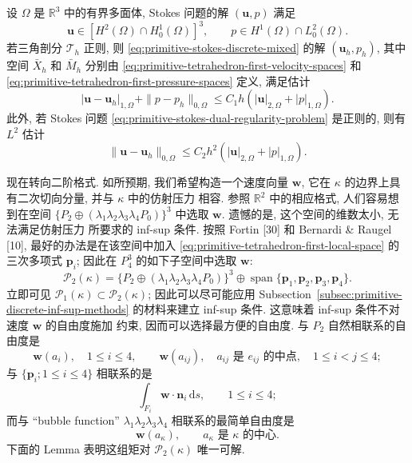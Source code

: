 \setcounter{statement}{3}
\begin{Theorem}\label{thm:primitive-tetrahedron-first-convergence}
设 $\Omega$ 是 $\mathbb R^3$ 中的有界多面体, Stokes 问题的解
$(\mathbf u,p)$ 满足
\[
\mathbf u\in[H^2(\Omega)\cap H_0^1(\Omega)]^3,
\qquad p\in H^1(\Omega)\cap L_0^2(\Omega).
\]
若三角剖分 $\mathcal{T}_h$ 正则, 则
\eqref{eq:primitive-stokes-discrete-mixed} 的解 $(\mathbf u_h,p_h)$,
其中空间 $\bar X_h$ 和 $\bar M_h$ 分别由
\eqref{eq:primitive-tetrahedron-first-velocity-spaces} 和
\eqref{eq:primitive-tetrahedron-first-pressure-spaces} 定义, 满足估计
\begin{equation}\label{eq:primitive-tetrahedron-first-h1-error}
|\mathbf u-\mathbf u_h|_{1,\Omega}
+\|p-p_h\|_{0,\Omega}
\leq C_1h(|\mathbf u|_{2,\Omega}+|p|_{1,\Omega}).
\end{equation}
此外, 若 Stokes 问题
\eqref{eq:primitive-stokes-dual-regularity-problem} 是正则的, 则有
$L^2$ 估计
\begin{equation}\label{eq:primitive-tetrahedron-first-l2-error}
\|\mathbf u-\mathbf u_h\|_{0,\Omega}
\leq C_2h^2(|\mathbf u|_{2,\Omega}+|p|_{1,\Omega}).
\end{equation}
\end{Theorem}

现在转向二阶格式. 如所预期, 我们希望构造一个速度向量 $\mathbf w$,
它在 $\kappa$ 的边界上具有二次切向分量, 并与 $\kappa$ 中的仿射压力
相容. 参照 $\mathbb R^2$ 中的相应格式, 人们容易想到在空间
$\{P_2\oplus(\lambda_1\lambda_2\lambda_3\lambda_4P_0)\}^3$
中选取 $\mathbf w$. 遗憾的是, 这个空间的维数太小, 无法满足仿射压力
所要求的 inf-sup 条件. 按照 Fortin [30] 和 Bernardi \& Raugel [10],
最好的办法是在该空间中加入
\eqref{eq:primitive-tetrahedron-first-local-space} 的三次多项式
$\mathbf p_i$; 因此在 $P_4^3$ 的如下子空间中选取 $\mathbf w$:
\begin{equation}\label{eq:primitive-tetrahedron-second-local-space}
\mathcal{P}_2(\kappa)
=\{P_2\oplus(\lambda_1\lambda_2\lambda_3\lambda_4P_0)\}^3
\oplus\operatorname{span}\{\mathbf p_1,\mathbf p_2,\mathbf p_3,\mathbf p_4\}.
\end{equation}
立即可见 $\mathcal{P}_1(\kappa)\subset\mathcal{P}_2(\kappa)$;
因此可以尽可能应用
Subsection~\ref{subsec:primitive-discrete-inf-sup-methods} 的材料来建立
inf-sup 条件. 这意味着 inf-sup 条件不对速度 $\mathbf w$ 的自由度施加
约束, 因而可以选择最方便的自由度. 与 $P_2$ 自然相联系的自由度是
\[
\mathbf w(a_i),\quad1\leq i\leq4,
\qquad
\mathbf w(a_{ij}),\quad a_{ij}\text{ 是 }e_{ij}\text{ 的中点},
\quad1\leq i<j\leq4;
\]
与 $\{\mathbf p_i;1\leq i\leq4\}$ 相联系的是
\[
\int_{F_i}\mathbf w\cdot\mathbf n_i\,\mathrm ds,
\qquad1\leq i\leq4;
\]
而与 ``bubble function'' $\lambda_1\lambda_2\lambda_3\lambda_4$
相联系的最简单自由度是
\[
\mathbf w(a_\kappa),
\qquad a_\kappa\text{ 是 }\kappa\text{ 的中心}.
\]
下面的 Lemma 表明这组矩对 $\mathcal{P}_2(\kappa)$ 唯一可解.

